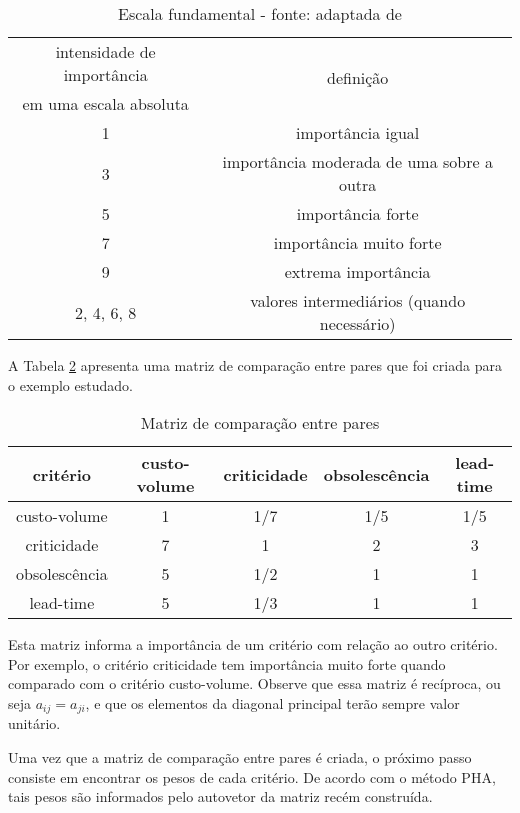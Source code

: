 \documentclass{book}
\begin{document}
\begin{table}[h]
\begin{center}
\begin{tabular}[c]{c c}
intensidade de importância & \multirow{2}{*}{definição} \\
em uma escala absoluta & \\
1 & importância igual  \\
3 & importância moderada de uma sobre a outra \\
5 & importância forte \\
7 & importância muito forte \\
9 & extrema importância \\
2, 4, 6, 8 & valores intermediários (quando necessário) \\
\end{tabular}
\caption{Escala fundamental - fonte: adaptada de \cite{Saaty1987}}
\label{tab:escalaFundamental}
\end{center}
\end{table}

A Tabela \ref{tab:matrizComparativa} apresenta uma matriz de comparação entre pares que foi criada para o exemplo estudado.

\begin{table}[h]
\begin{center}
\begin{tabular}[c]{c | c c c c}
critério & custo-volume & criticidade & obsolescência  & lead-time \\
\hline
custo-volume & 1 & 1/7 & 1/5 & 1/5 \\
criticidade  & 7 & 1 & 2 & 3\\
obsolescência & 5 & 1/2 & 1 & 1\\
lead-time & 5 & 1/3 & 1 & 1\\
\end{tabular}
\caption{Matriz de comparação entre pares}
\label{tab:matrizComparativa}
\end{center}
\end{table}

Esta matriz informa a importância de um critério com relação ao outro critério. Por exemplo, o critério criticidade tem importância muito forte quando comparado com o critério custo-volume. Observe que essa matriz é recíproca, ou seja $a_{ij} = a_{ji}$, e que os elementos da diagonal principal terão sempre valor unitário. 

Uma vez que a matriz de comparação entre pares é criada, o próximo passo consiste em encontrar os pesos de cada critério. De acordo com o método PHA, tais pesos são informados pelo autovetor da matriz recém construída.
\end{document}
